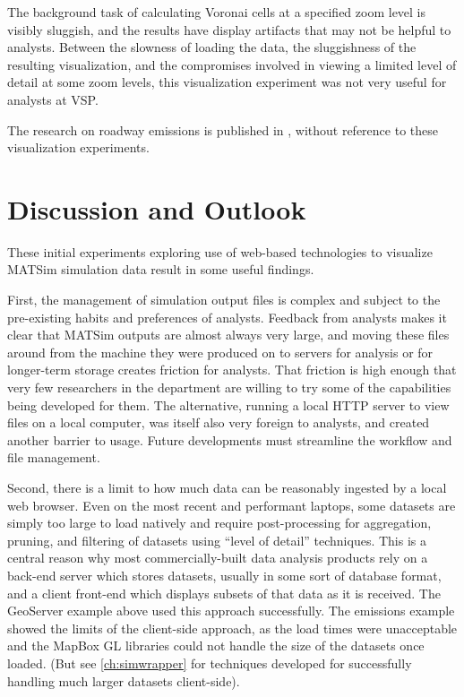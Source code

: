 The background task of calculating Voronai cells at a specified zoom level is visibly sluggish, and the results have display artifacts that may not be helpful to analysts. Between the slowness of loading the data, the sluggishness of the resulting visualization, and the compromises involved in viewing a limited level of detail at some zoom levels, this visualization experiment was not very useful for analysts at VSP.

The research on roadway emissions is published in \cite{kaddoura2022exhaust}, without reference to these visualization experiments.

\hypertarget{server-experiments-findings}{%
\section{Discussion and Outlook}\label{server-experiments-findings}}

These initial experiments exploring use of web-based technologies to visualize MATSim simulation data result in some useful findings.

First, the management of simulation output files is complex and subject to the pre-existing habits and preferences of analysts. Feedback from analysts makes it clear that MATSim outputs are almost always very large, and moving these files around from the machine they were produced on to servers for analysis or for longer-term storage creates friction for analysts. That friction is high enough that very few researchers in the department are willing to try some of the capabilities being developed for them. The alternative, running a local HTTP server to view files on a local computer, was itself also very foreign to analysts, and created another barrier to usage. Future developments must streamline the workflow and file management.

Second, there is a limit to how much data can be reasonably ingested by a local web browser. Even on the most recent and performant laptops, some datasets are simply too large to load natively and require post-processing for aggregation, pruning, and filtering of datasets using ``level of detail'' techniques. This is a central reason why most commercially-built data analysis products rely on a back-end server which stores datasets, usually in some sort of database format, and a client front-end which displays subsets of that data as it is received. The GeoServer example above used this approach successfully. The emissions example showed the limits of the client-side approach, as the load times were unacceptable and the MapBox GL libraries could not handle the size of the datasets once loaded. (But see \autoref{ch:simwrapper} for techniques developed for successfully handling much larger datasets client-side).

